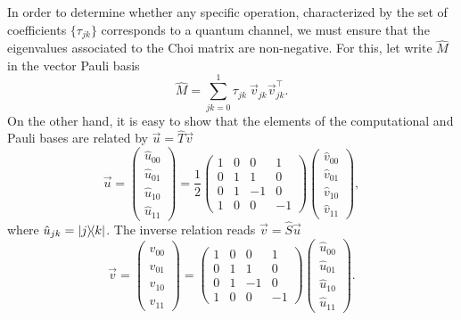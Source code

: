 \documentclass[11pt,dvipsnames]{article} %
\newcommand{\1}{\mathds{1}}
\begin{document}
In order to determine whether any specific operation, characterized by the set of coefficients $\{\tau_{jk}\}$ corresponds to a quantum channel, we must ensure that the eigenvalues associated to the Choi matrix are non-negative. For this, let write $\hat{M}$ in the vector Pauli basis
%
\begin{equation}
 \hat{M}=\sum_{jk=0}^1\tau_{jk}~\vec{v}_{jk}\vec{v}_{jk}^\intercal.
 \label{EQA1}
\end{equation}
%
On the other hand, it is easy to show that the elements of the computational and Pauli bases are related by $\vec{u}=\hat{T}\vec{v}$
\begin{equation}
\vec{u}=\begin{pmatrix}
\hat{u}_{00} \\ \hat{u}_{01} \\ \hat{u}_{10} \\ \hat{u}_{11}
\end{pmatrix}=\frac{1}{2}\begin{pmatrix}
1 & 0 & 0 & 1\\
0 & 1 & 1 & 0\\
0 & 1 & -1 & 0\\
1 & 0 & 0 & -1
\end{pmatrix} \begin{pmatrix}
\hat{v}_{00} \\ \hat{v}_{01} \\ \hat{v}_{10} \\ \hat{v}_{11}
\end{pmatrix},
\end{equation}
% 
where $\hat{u}_{jk}=\dyad{j}{k}$. The inverse relation reads $\vec{v}=\hat{S}\vec{u}$
\begin{equation}
\vec{v}=\begin{pmatrix}
\hat{v}_{00} \\ \hat{v}_{01} \\ \hat{v}_{10} \\ \hat{v}_{11}
\end{pmatrix}=\begin{pmatrix}
1 & 0 & 0 & 1\\
0 & 1 & 1 & 0\\
0 & 1 & -1 & 0\\
1 & 0 & 0 & -1
\end{pmatrix} \begin{pmatrix}
\hat{u}_{00} \\ \hat{u}_{01} \\ \hat{u}_{10} \\ \hat{u}_{11}
\end{pmatrix}.
\end{equation}
\end{document}
